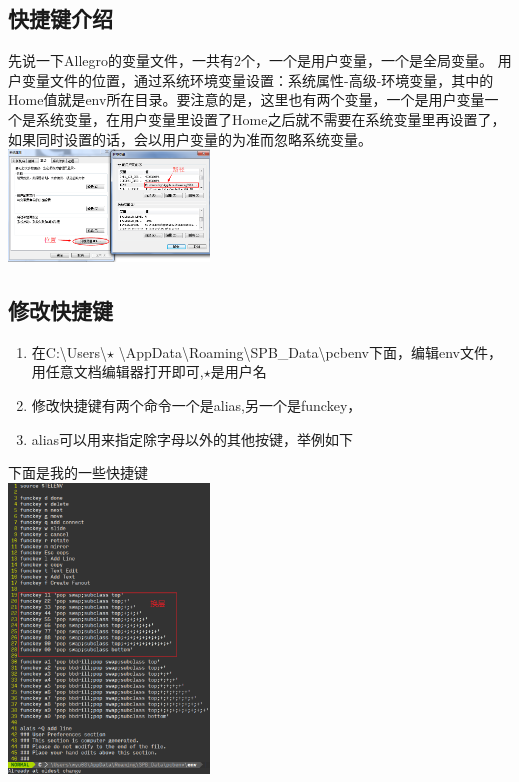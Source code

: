 \documentclass[color=green,mathpazo,titlestyle=hang,11pt]{elegantbook}
\begin{document}
	\subsection{快捷键介绍}
	先说一下Allegro的变量文件，一共有2个，一个是用户变量，一个是全局变量。
	用户变量文件的位置，通过系统环境变量设置：系统属性-高级-环境变量，其中的Home值就是env所在目录。要注意的是，这里也有两个变量，一个是用户变量一个是系统变量，在用户变量里设置了Home之后就不需要在系统变量里再设置了，如果同时设置的话，会以用户变量的为准而忽略系统变量。
	\\ \includegraphics[width=0.4\textwidth]{figures/SystemEnviroment.png}
	\subsection{修改快捷键}
	\begin{enumerate}
		\item 在C:\textbackslash Users\textbackslash $\star$ \textbackslash AppData\textbackslash Roaming\textbackslash SPB\_Data\textbackslash pcbenv下面，编辑env文件，用任意文档编辑器打开即可,$\star$是用户名
		\item 修改快捷键有两个命令一个是alias,另一个是funckey，
		\item alias可以用来指定除字母以外的其他按键，举例如下
	\end{enumerate}
	下面是我的一些快捷键
	\\ \includegraphics[width=0.4\textwidth]{figures/AllegroKey.png}
\end{document}
